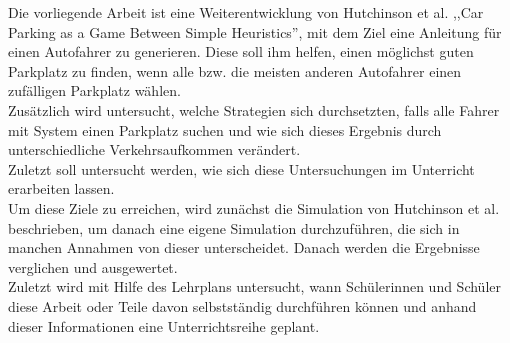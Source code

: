 Die vorliegende Arbeit ist eine Weiterentwicklung von Hutchinson et al. ,,Car Parking as a Game Between Simple Heuristics''\cite{hutchinson}, mit dem Ziel eine Anleitung für einen Autofahrer zu generieren. Diese soll ihm helfen, einen möglichst guten Parkplatz zu finden, wenn alle bzw. die meisten anderen Autofahrer einen zufälligen Parkplatz wählen.\\
Zusätzlich wird untersucht, welche Strategien sich durchsetzten, falls alle Fahrer mit System einen Parkplatz suchen und wie sich dieses Ergebnis durch unterschiedliche Verkehrsaufkommen verändert.\\
 Zuletzt soll untersucht werden, wie sich diese Untersuchungen im Unterricht erarbeiten lassen.\\
  Um diese Ziele zu erreichen, wird zunächst die Simulation von Hutchinson et al. beschrieben, um danach eine eigene Simulation durchzuführen, die sich in manchen Annahmen von dieser unterscheidet. Danach werden die Ergebnisse verglichen und ausgewertet.\\
  Zuletzt wird mit Hilfe des Lehrplans untersucht, wann Schülerinnen und Schüler diese Arbeit oder Teile davon selbstständig durchführen können und anhand dieser Informationen eine Unterrichtsreihe geplant.